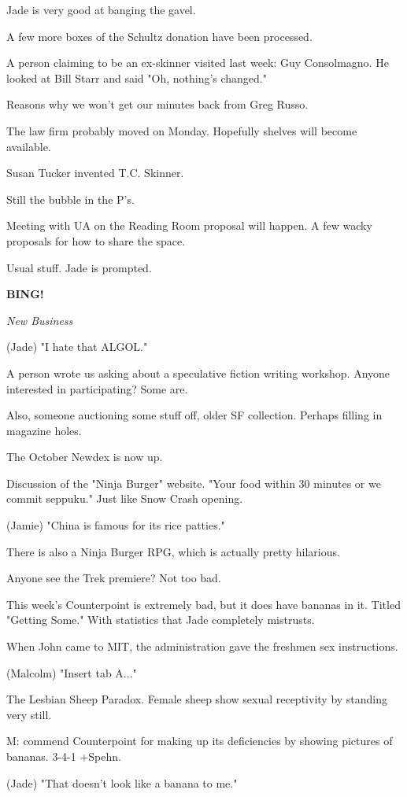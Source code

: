 \documentclass[12pt]{article}
\newcommand{\bing}{{\bf BING!} }
\newcommand{\goto}[1]{\bing \vskip 12pt \centerline{{\em{#1}}}}
\begin{document}
Jade is very good at banging the gavel.

A few more boxes of the Schultz donation have been processed.

A person claiming to be an ex-skinner visited last week: Guy Consolmagno. He looked at Bill Starr and said "Oh, nothing's changed."

Reasons why we won't get our minutes back from Greg Russo.

The law firm probably moved on Monday. Hopefully shelves will become available.

Susan Tucker invented T.C. Skinner.

Still the bubble in the P's.

Meeting with UA on the Reading Room proposal will happen. A few wacky proposals for how to share the space.

Usual stuff. Jade is prompted.

\goto{New Business}

(Jade) "I hate that ALGOL."

A person wrote us asking about a speculative fiction writing workshop. Anyone interested in participating? Some are.

Also, someone auctioning some stuff off, older SF collection. Perhaps filling in magazine holes.

The October Newdex is now up.

Discussion of the "Ninja Burger" website. "Your food within 30 minutes or we commit seppuku." Just like Snow Crash opening.

(Jamie) "China is famous for its rice patties."

There is also a Ninja Burger RPG, which is actually pretty hilarious.

Anyone see the Trek premiere? Not too bad.

This week's Counterpoint is extremely bad, but it does have bananas in it. Titled "Getting Some." With statistics that Jade completely mistrusts.

When John came to MIT, the administration gave the freshmen sex instructions.

(Malcolm) "Insert tab A..."

The Lesbian Sheep Paradox. Female sheep show sexual receptivity by standing very still.

M: commend Counterpoint for making up its deficiencies by showing pictures of bananas. 3-4-1 +Spehn.

(Jade) "That doesn't look like a banana to me."
\end{document}
